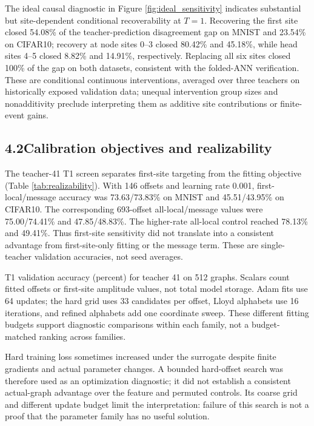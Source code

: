 \documentclass[11pt]{article}
\begin{document}
The ideal causal diagnostic in Figure \ref{fig:ideal_sensitivity} indicates substantial but site-dependent conditional recoverability at $T=1$. Recovering the first site closed 54.08\% of the teacher-prediction disagreement gap on MNIST and 23.54\% on CIFAR10; recovery at node sites 0--3 closed 80.42\% and 45.18\%, while head sites 4--5 closed 8.82\% and 14.91\%, respectively. Replacing all six sites closed 100\% of the gap on both datasets, consistent with the folded-ANN verification. These are conditional continuous interventions, averaged over three teachers on historically exposed validation data; unequal intervention group sizes and nonadditivity preclude interpreting them as additive site contributions or finite-event gains.

\subsection*{4.2\quad Calibration objectives and realizability}

The teacher-41 T1 screen separates first-site targeting from the fitting objective (Table \ref{tab:realizability}). With 146 offsets and learning rate 0.001, first-local/message accuracy was 73.63/73.83\% on MNIST and 45.51/43.95\% on CIFAR10. The corresponding 693-offset all-local/message values were 75.00/74.41\% and 47.85/48.83\%. The higher-rate all-local control reached 78.13\% and 49.41\%. Thus first-site sensitivity did not translate into a consistent advantage from first-site-only fitting or the message term. These are single-teacher validation accuracies, not seed averages.

\begin{table}[!htbp]
\centering
\small
\caption{T1 validation accuracy (percent) for teacher 41 on 512 graphs. Scalars count fitted offsets or first-site amplitude values, not total model storage. Adam fits use 64 updates; the hard grid uses 33 candidates per offset, Lloyd alphabets use 16 iterations, and refined alphabets add one coordinate sweep. These different fitting budgets support diagnostic comparisons within each family, not a budget-matched ranking across families.}
\label{tab:realizability}
\begin{adjustbox}{max width=\linewidth}\end{adjustbox}
\end{table}

Hard training loss sometimes increased under the surrogate despite finite gradients and actual parameter changes. A bounded hard-offset search was therefore used as an optimization diagnostic; it did not establish a consistent actual-graph advantage over the feature and permuted controls. Its coarse grid and different update budget limit the interpretation: failure of this search is not a proof that the parameter family has no useful solution.
\end{document}
